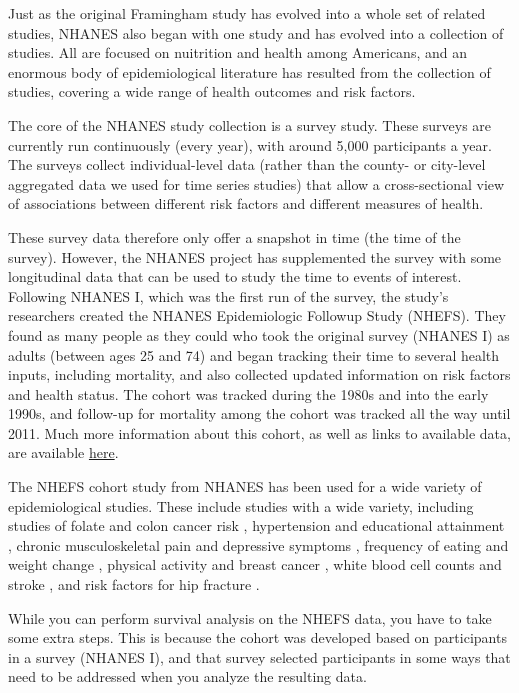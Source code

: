 \documentclass[
]{book}
\begin{document}
Just as the original Framingham study has evolved into a whole set of related studies, NHANES also began with one study and has evolved into a collection of studies. All are focused on nuitrition and health among Americans, and an enormous body of epidemiological literature has resulted from the collection of studies, covering a wide range of health outcomes and risk factors.

The core of the NHANES study collection is a survey study. These surveys are currently run continuously (every year), with around 5,000 participants a year. The surveys collect individual-level data (rather than the county- or city-level aggregated data we used for time series studies) that allow a cross-sectional view of associations between different risk factors and different measures of health.

These survey data therefore only offer a snapshot in time (the time of the survey). However, the NHANES project has supplemented the survey with some longitudinal data that can be used to study the time to events of interest. Following NHANES I, which was the first run of the survey, the study's researchers created the NHANES Epidemiologic Followup Study (NHEFS). They found as many people as they could who took the original survey (NHANES I) as adults (between ages 25 and 74) and began tracking their time to several health inputs, including mortality, and also collected updated information on risk factors and health status. The cohort was tracked during the 1980s and into the early 1990s, and follow-up for mortality among the cohort was tracked all the way until 2011. Much more information about this cohort, as well as links to available data, are available \href{https://wwwn.cdc.gov/nchs/nhanes/nhefs/default.aspx/\#dfd}{here}.

The NHEFS cohort study from NHANES has been used for a wide variety of epidemiological studies. These include studies with a wide variety, including studies of folate and colon cancer risk \citep{su2001nutritional}, hypertension and educational attainment \citep{vargas2000incidence}, chronic musculoskeletal pain and depressive symptoms \citep{magni1993chronic}, frequency of eating and weight change \citep{kant1995frequency}, physical activity and breast cancer \citep{breslow2001long}, white blood cell counts and stroke \citep{gillum1994white}, and risk factors for hip fracture \citep{mussolino1998risk}.

While you can perform survival analysis on the NHEFS data, you have to take some extra steps. This is because the cohort was developed based on participants in a survey (NHANES I), and that survey selected participants in some ways that need to be addressed when you analyze the resulting data.
\end{document}

